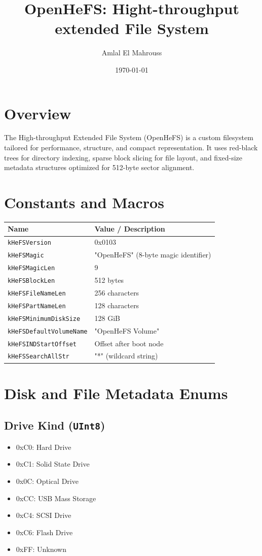\documentclass{article}
\title{OpenHeFS: Hight-throughput extended File System}
\author{Amlal El Mahrouss}
\date{\today}
\begin{document}
\maketitle

\section{Overview}
The High-throughput Extended File System (OpenHeFS) is a custom filesystem tailored for performance, structure, and compact representation. It uses red-black trees for directory indexing, sparse block slicing for file layout, and fixed-size metadata structures optimized for 512-byte sector alignment.

\section{Constants and Macros}
\begin{longtable}{|l|l|}
\hline
\textbf{Name} & \textbf{Value / Description} \\
\hline
\texttt{kHeFSVersion} & 0x0103 \\
\texttt{kHeFSMagic} & "OpenHeFS" (8-byte magic identifier) \\
\texttt{kHeFSMagicLen} & 9 \\
\texttt{kHeFSBlockLen} & 512 bytes \\
\texttt{kHeFSFileNameLen} & 256 characters \\
\texttt{kHeFSPartNameLen} & 128 characters \\
\texttt{kHeFSMinimumDiskSize} & 128 GiB \\
\texttt{kHeFSDefaultVolumeName} & "OpenHeFS Volume" \\
\texttt{kHeFSINDStartOffset} & Offset after boot node \\
\texttt{kHeFSSearchAllStr} & "*" (wildcard string) \\
\hline
\end{longtable}

\section{Disk and File Metadata Enums}\label{sec:disk-and-file-metadata-enums}

\subsection{Drive Kind (\texttt{UInt8})}\label{subsec:drive-kind-(texttt{uint8})}
\begin{itemize}
\item 0xC0: Hard Drive
\item 0xC1: Solid State Drive
\item 0x0C: Optical Drive
\item 0xCC: USB Mass Storage
\item 0xC4: SCSI Drive
\item 0xC6: Flash Drive
\item 0xFF: Unknown
\end{itemize}
\end{document}
